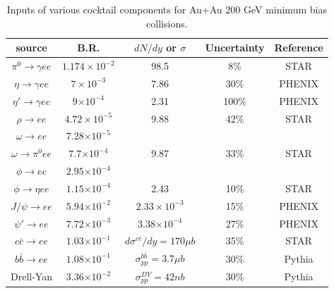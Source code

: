 \begin{table}
\begin{centering}
\begin{tabular}{c|c|c|c|c}
\hline 
source & B.R. & $dN/dy$ or $\sigma$ & Uncertainty & Reference\tabularnewline
\hline 
\hline 
$\pi^{0}\rightarrow\gamma ee$ & $1.174\times10^{-2}$ & 98.5 & 8\% & STAR \cite{PhysRevLett.92.112301,PhysRevLett.97.152301}\tabularnewline
$\eta\rightarrow\gamma ee$ & $7\times10^{-3}$ & 7.86 & 30\% & PHENIX \cite{PhysRevC.81.034911}\tabularnewline
$\eta'\rightarrow\gamma ee$ & $9\text{×}10^{\text{−}4}$ & 2.31 & 100\% & PHENIX \cite{PhysRevC.81.034911}\tabularnewline
$\rho\rightarrow ee$ & $4.72\times10^{-5}$ & 9.88 & 42\% & STAR \cite{PhysRevLett.92.092301}\tabularnewline
$\omega\rightarrow ee$ & $7.28\text{×}10^{\text{−}5}$ &  &  & \tabularnewline
$\omega\rightarrow\pi^{0}ee$ & $7.7\text{×}10^{\text{−}4}$ & 9.87 & 33\% & STAR \cite{STAR-Collaboration:2012wq}\tabularnewline
$\phi\rightarrow ee$ & $2.95\text{×}10^{\text{−}4}$ &  &  & \tabularnewline
$\phi\rightarrow\eta ee$ & $1.15\text{×}10^{\text{−}4}$ & 2.43 & 10\% & STAR \cite{Adams2005181}\tabularnewline
$J/\psi\rightarrow ee$ & $5.94\text{×}10^{\text{−}2}$ & $2.33\times10^{-3}$ & 15\% & PHENIX \cite{PhysRevLett.98.232301}\tabularnewline
$\psi'\rightarrow ee$ & $7.72\text{×}10^{\text{−}3}$ & $3.38\text{×}10^{\text{−}4}$ & 27\% & PHENIX \cite{al.:kb,daSilva2009227c}\tabularnewline
\hline 
\hline 
$c\bar{c}\rightarrow ee$ & $1.03\text{×}10^{\text{−}1}$ & $d\sigma^{c\bar{c}}/dy=170\mu b$ & 35\% & STAR \cite{PhysRevD.86.072013}\tabularnewline
$b\bar{b}\rightarrow ee$ & $1.08\text{×}10^{\text{−}1}$ & $\sigma_{pp}^{b\bar{b}}=3.7\mu b$ & 30\% & Pythia \cite{Torbjorn-Sjostrand:2001ek}\tabularnewline
Drell-Yan & $3.36\text{×}10^{\text{−}2}$ & $\sigma_{pp}^{DY}=42nb$ & 30\% & Pythia \cite{Torbjorn-Sjostrand:2001ek}\tabularnewline
\hline 
\end{tabular}
\par\end{centering}

\protect\caption{Inputs of various cocktail components for Au+Au 200 GeV minimum bias
collisions. }


\label{table:CK AuAuinput}
\end{table}


